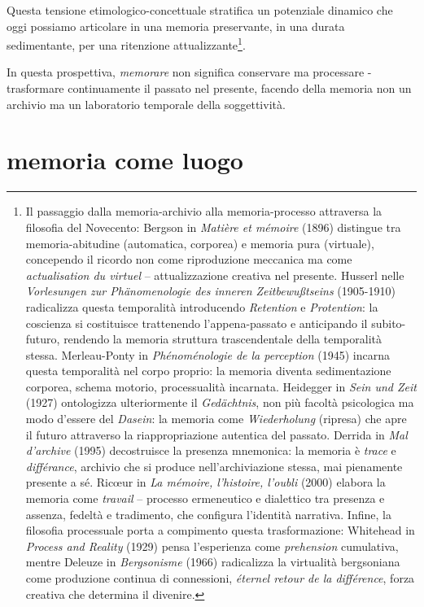 Questa tensione etimologico-concettuale stratifica un potenziale dinamico che oggi possiamo articolare in una memoria preservante, in una durata sedimentante, per una ritenzione attualizzante\footnote{%
 Il passaggio dalla memoria-archivio alla memoria-processo attraversa la filosofia del Novecento: Bergson in \emph{Matière et mémoire} (1896) distingue tra memoria-abitudine (automatica, corporea) e memoria pura (virtuale), concependo il ricordo non come riproduzione meccanica ma come \emph{actualisation du virtuel} – attualizzazione creativa nel presente. Husserl nelle \emph{Vorlesungen zur Phänomenologie des inneren Zeitbewußtseins} (1905-1910) radicalizza questa temporalità introducendo \emph{Retention} e \emph{Protention}: la coscienza si costituisce trattenendo l'appena-passato e anticipando il subito-futuro, rendendo la memoria struttura trascendentale della temporalità stessa. Merleau-Ponty in \emph{Phénoménologie de la perception} (1945) incarna questa temporalità nel corpo proprio: la memoria diventa sedimentazione corporea, schema motorio, processualità incarnata. Heidegger in \emph{Sein und Zeit} (1927) ontologizza ulteriormente il \emph{Gedächtnis}, non più facoltà psicologica ma modo d'essere del \emph{Dasein}: la memoria come \emph{Wiederholung} (ripresa) che apre il futuro attraverso la riappropriazione autentica del passato. Derrida in \emph{Mal d'archive} (1995) decostruisce la presenza mnemonica: la memoria è \emph{trace} e \emph{différance}, archivio che si produce nell'archiviazione stessa, mai pienamente presente a sé. Ricœur in \emph{La mémoire, l'histoire, l'oubli} (2000) elabora la memoria come \emph{travail} – processo ermeneutico e dialettico tra presenza e assenza, fedeltà e tradimento, che configura l'identità narrativa. Infine, la filosofia processuale porta a compimento questa trasformazione: Whitehead in \emph{Process and Reality} (1929) pensa l'esperienza come \emph{prehension} cumulativa, mentre Deleuze in \emph{Bergsonisme} (1966) radicalizza la virtualità bergsoniana come produzione continua di connessioni, \emph{éternel retour de la différence}, forza creativa che determina il divenire.
}.

In questa prospettiva, \emph{memorare} non significa conservare ma processare - trasformare continuamente il passato nel presente, facendo della memoria non un archivio ma un laboratorio temporale della soggettività.

\section{memoria come luogo}

